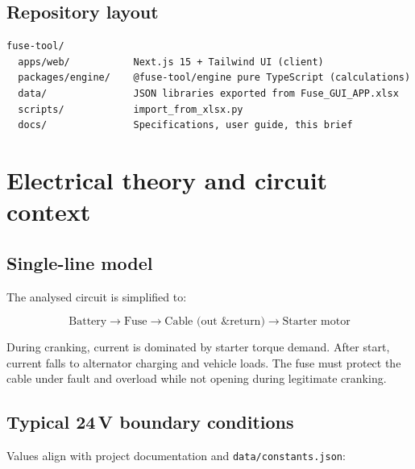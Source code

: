 \documentclass[11pt,a4paper]{report}
\begin{document}
\section{Repository layout}

\begin{verbatim}
fuse-tool/
  apps/web/           Next.js 15 + Tailwind UI (client)
  packages/engine/    @fuse-tool/engine pure TypeScript (calculations)
  data/               JSON libraries exported from Fuse_GUI_APP.xlsx
  scripts/            import_from_xlsx.py
  docs/               Specifications, user guide, this brief
\end{verbatim}

\chapter{Electrical theory and circuit context}

\section{Single-line model}

The analysed circuit is simplified to:

\[
  \text{Battery} \rightarrow \text{Fuse} \rightarrow \text{Cable (out \& return)} \rightarrow \text{Starter motor}
\]

During cranking, current is dominated by starter torque demand. After start, current falls to alternator charging and vehicle loads. The fuse must protect the cable under fault and overload while not opening during legitimate cranking.

\section{Typical 24\,V boundary conditions}

Values align with project documentation and \texttt{data/constants.json}:
\end{document}
